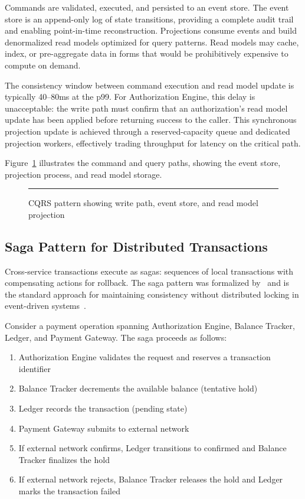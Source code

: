 Commands are validated, executed, and persisted to an event store. The event store is an append-only log of state transitions, providing a complete audit trail and enabling point-in-time reconstruction. Projections consume events and build denormalized read models optimized for query patterns. Read models may cache, index, or pre-aggregate data in forms that would be prohibitively expensive to compute on demand.

The consistency window between command execution and read model update is typically 40--80ms at the p99. For Authorization Engine, this delay is unacceptable: the write path must confirm that an authorization's read model update has been applied before returning success to the caller. This synchronous projection update is achieved through a reserved-capacity queue and dedicated projection workers, effectively trading throughput for latency on the critical path.

Figure~\ref{fig:read-write-separation} illustrates the command and query paths, showing the event store, projection process, and read model storage.

\begin{figure}[htbp]
\centering
\rule{0.8\textwidth}{0.35\textwidth}
\caption{CQRS pattern showing write path, event store, and read model projection}
\label{fig:read-write-separation}
\end{figure}

\subsection{Saga Pattern for Distributed Transactions}

Cross-service transactions execute as sagas: sequences of local transactions with compensating actions for rollback. The saga pattern was formalized by~\cite{garcia-molina-sagas-1987} and is the standard approach for maintaining consistency without distributed locking in event-driven systems~\cite{richardson-microservices-patterns-2018}.

Consider a payment operation spanning Authorization Engine, Balance Tracker, Ledger, and Payment Gateway. The saga proceeds as follows:
\begin{enumerate}
\item Authorization Engine validates the request and reserves a transaction identifier
\item Balance Tracker decrements the available balance (tentative hold)
\item Ledger records the transaction (pending state)
\item Payment Gateway submits to external network
\item If external network confirms, Ledger transitions to confirmed and Balance Tracker finalizes the hold
\item If external network rejects, Balance Tracker releases the hold and Ledger marks the transaction failed
\end{enumerate}

